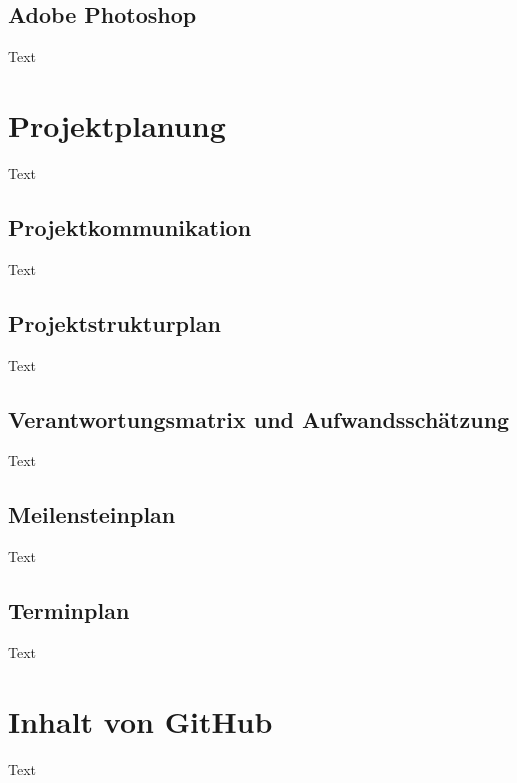 \subsection{Adobe Photoshop}
Text



\section{Projektplanung}
Text
\subsection{Projektkommunikation}
Text
\subsection{Projektstrukturplan}
Text
\subsection{Verantwortungsmatrix und Aufwandsschätzung}
Text
\subsection{Meilensteinplan}
Text
\subsection{Terminplan}
Text


\section{Inhalt von GitHub}
Text






